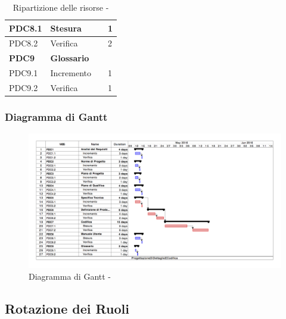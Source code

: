 \documentclass[12pt,a4paper]{article}
\begin{document}
\begin{table}[H]
\begin{center}
\begin{tabular}{p{} p{} p{} p{}}
			PDC8.1 & Stesura & \AM \newline \PG & 1 \newline 5 \\ \midrule
			PDC8.2 & Verifica & \VR & 2 \\ \midrule
			\textbf{PDC9} & \textbf{Glossario} & & \\ \midrule
			PDC9.1 & Incremento & \VR & 1 \\ \midrule
			PDC9.2 & Verifica & \VR & 1 \\
			\bottomrule
		\end{tabular}
		\caption{Ripartizione delle risorse - \FPDC}
	\end{center}
\end{table}

\subsubsection{Diagramma di Gantt}

\begin{center}
	\begin{figure}[H]
		\centering
		\includegraphics[width=\textwidth]{GanttProgettazioneDiDettaglioECodifica.png}
		\caption{Diagramma di Gantt - \FPDC}
	\end{figure}
\end{center}

\subsection{Rotazione dei Ruoli}
\end{document}
